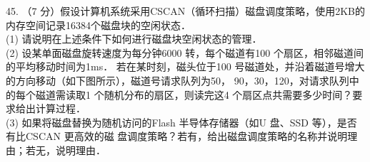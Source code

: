 45. （7 分）假设计算机系统采用CSCAN（循环扫描）磁盘调度策略，使用2KB的内存空间记录16384个磁盘块的空闲状态． \\
(1) 请说明在上述条件下如何进行磁盘块空闲状态的管理． \\
(2) 设某单面磁盘旋转速度为每分钟6000 转，每个磁道有100 个扇区，相邻磁道间的平均移动时间为1ms．
若在某时刻，磁头位于100 号磁道处，并沿着磁道号增大的方向移动（如下图所示），磁道号请求队列为50，
90，30，120，对请求队列中的每个磁道需读取1 个随机分布的扇区，则读完这4 个扇区点共需要多少时间？要求给出计算过程． \\
(3) 如果将磁盘替换为随机访问的Flash 半导体存储器（如U 盘、SSD 等），是否有比CSCAN 更高效的磁
盘调度策略？若有，给出磁盘调度策略的名称并说明理由；若无，说明理由．

